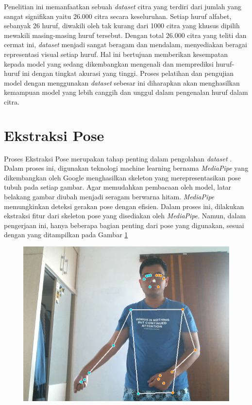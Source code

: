 Penelitian ini memanfaatkan sebuah \textit{dataset} citra yang terdiri dari jumlah yang sangat signifikan yaitu 26.000 citra secara keseluruhan. Setiap huruf alfabet, sebanyak 26 huruf, diwakili oleh tak kurang dari 1000 citra yang khusus dipilih mewakili masing-masing huruf tersebut. Dengan total 26.000 citra yang teliti dan cermat ini, \textit{dataset} menjadi sangat beragam dan mendalam, menyediakan beragai representasi visual setiap huruf. Hal ini bertujuan memberikan kesempatan kepada model yang sedang dikembangkan mengenali dan memprediksi huruf-huruf ini dengan tingkat akurasi yang tinggi. Proses pelatihan dan pengujian model dengan menggunakan \textit{dataset} sebesar ini diharapkan akan menghasilkan kemampuan model yang lebih canggih dan unggul dalam pengenalan huruf dalam citra.
\section{Ekstraksi Pose}
Proses Ekstraksi Pose merupakan tahap penting dalam pengolahan \textit{dataset} . Dalam proses ini, digunakan teknologi machine learning bernama \textit{MediaPipe} yang dikembangkan oleh Google menghasilkan skeleton yang merepresentasikan pose tubuh pada setiap gambar. Agar memudahkan pembacaan oleh model, latar belakang gambar diubah menjadi seragam berwarna hitam. \textit{MediaPipe} memungkinkan deteksi gerakan pose dengan efisien. Dalam proses ini, dilakukan ekstraksi fitur dari skeleton pose yang disediakan oleh \textit{MediaPipe}. Namun, dalam pengerjaan ini, hanya beberapa bagian penting dari  pose yang digunakan, sesuai dengan yang ditampilkan pada Gambar \ref{fig:CITRAAWAL1}
\begin{figure}[hbt!]
	\centering
	\includegraphics[width=0.7\linewidth]{gambar/Gambar3.3.png}
	\label{fig:CITRAAWAL1}
\end{figure}
